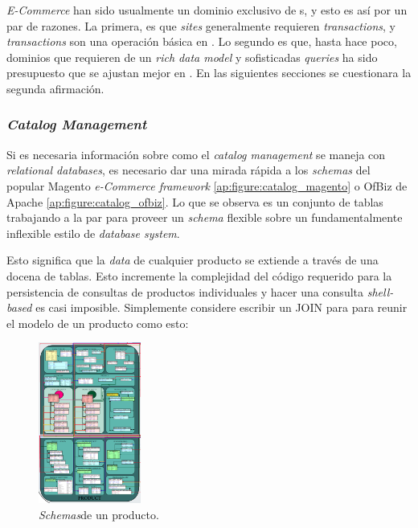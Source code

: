 \textit{E-Commerce} han sido usualmente un dominio exclusivo de s, y esto es así por un par de razones. La primera, es que \textit{ sites} generalmente requieren \textit{transactions}, y \textit{transactions} son una operación básica en . Lo segundo es que, hasta hace poco, dominios que requieren de un \textit{rich data model} y sofisticadas \textit{queries} ha sido presupuesto que se ajustan mejor en . En las siguientes secciones se cuestionara la segunda afirmación. 

\subsubsection{\textit{Catalog Management}}

Si es necesaria información sobre como el \textit{catalog management} se maneja con \textit{relational databases}, es necesario dar una mirada rápida a los \textit{schemas} del popular Magento \textit{e-Commerce framework} \ref{ap:figure:catalog_magento} o OfBiz de Apache \ref{ap:figure:catalog_ofbiz}. Lo que se observa es un conjunto de tablas trabajando a la par para proveer un \textit{schema} flexible sobre un fundamentalmente inflexible estilo de \textit{database system}.

Esto significa que la \textit{data} de cualquier producto se extiende a través de una docena de tablas. Esto incremente la complejidad del código requerido para la persistencia de consultas de productos individuales y hacer una consulta \textit{shell-based} es casi imposible. Simplemente considere escribir un  JOIN para para reunir el modelo de un producto como esto:

\begin{figure}[h!]
	\centering
	\includegraphics[width=0.3\textwidth]{figuras/cap2/magento_product_schema.png}
	\caption{\textit{Schemas}de un producto.}
	\label{cap:figure:catalog_magento}
\end{figure}

